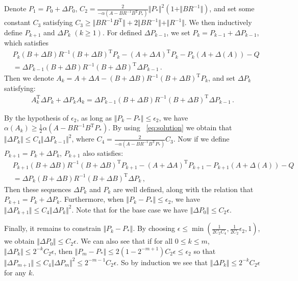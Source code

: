 \documentclass{article}
\theoremstyle{definition}
\begin{document}
Denote $P_{1}=P_{0}+\Delta P_{0}$,  $C_{2}=\frac{2}{-\alpha(A-BR^{-1}B^{\mathrm{T}}P_{*})}\Vert P_{*}\Vert ^{2}(1+\Vert BR^{-1}\Vert )$, and set some constant $C_{3}$ satisfying
$C_{3}\geq \Vert BR^{-1}B^{\mathrm{T}}\Vert +2\Vert BR^{-1}\Vert +\Vert R^{-1}\Vert $. We then inductively define $P_{k+1}$ and $\Delta P_{k}$ $(k\geq 1)$. For defined $\Delta P_{k-1}$, we set $P_{k}=P_{k-1}+\Delta P_{k-1}$, which satisfies
\begin{align*}
& P_{k}(B+\Delta B)R^{-1}(B+\Delta B)^{\mathrm{T}}P_{k}-(A+\Delta A)^{\mathrm{T}}P_{k}-P_{k}(A+\Delta(A))-Q\\&=\Delta P_{k-1}(B+\Delta B)R^{-1}(B+\Delta B)^{\mathrm{T}}\Delta P_{k-1}\,.
\end{align*} 
Then we denote $A_{k}=A+\Delta A-(B+\Delta B)R^{-1}(B+\Delta B)^{\mathrm{T}}P_{k}$, and set $\Delta P_{k}$ satisfying:
\begin{align*}
A^{\mathrm{T}}_{k}\Delta P_{k}+\Delta P_{k}A_{k} = \Delta P_{k-1}(B+\Delta B)R^{-1}(B+\Delta B)^{\mathrm{T}}\Delta P_{k-1}\,.
\end{align*}

By the hypothesis of $\epsilon_{2}$, as long as $\Vert P_{k}-P_{*}\Vert\leq \epsilon_{2}$, we have $\alpha(A_{k})\geq\frac{1}{2}\alpha(A-BR^{-1}B^{\mathrm{T}}P_{*})$. By using ~\eqref{eq:solution} we obtain that $\Vert \Delta P_{k}\Vert \leq C_{4}\Vert \Delta P_{k-1}\Vert ^{2}$, where $C_{4}=\frac{2}{-\alpha(A-BR^{-1}B^{\mathrm{T}}P_{*})}C_{3}$. Now if we define $P_{k+1}=P_{k}+\Delta P_{k}$, $P_{k+1}$ also satisfies:
\begin{align*}
& P_{k+1}(B+\Delta B)R^{-1}(B+\Delta B)^{\mathrm{T}}P_{k+1}-(A+\Delta A)^{\mathrm{T}}P_{k+1}-P_{k+1}(A+\Delta(A))-Q\\&=\Delta P_{k}(B+\Delta B)R^{-1}(B+\Delta B)^{\mathrm{T}}\Delta P_{k}\,,
\end{align*} 
Then these sequences $\Delta P_{k}$ and $P_{k}$ are well defined, along with the relation that $P_{k+1}=P_{k}+\Delta P_{k}$. Furthermore, when $\Vert P_{k}-P_{*}\Vert\leq \epsilon_{2}$, we have$\Vert\Delta P_{k+1}\Vert\leq C_{4}\Vert\Delta P_{k}\Vert^{2}$. Note that for the base case we have $\Vert \Delta P_{0}\Vert \leq C_{2}\epsilon$.

Finally, it remains to constrain $\Vert P_{k}-P_{*}\Vert$. By choosing $\epsilon\leq \min( \frac{1}{2C_{2}C_{4}}, \frac{1}{2C_{2}}\epsilon_{2},1)$, we obtain $\Vert \Delta P_{0}\Vert \leq C_{2}\epsilon$. We can also see that if for all $0\leq k\leq m$, $\Vert \Delta P_{k} \Vert \leq2^{-k}C_{2}\epsilon$, then $\Vert P_{m}-P_{*}\Vert \leq 2(1-2^{-m+1})C_{2}\epsilon\leq \epsilon_{2}$ so that $\Vert \Delta P_{m+1}\Vert \leq C_{4}\Vert \Delta P_{m}\Vert^{2}\leq 2^{-m-1}C_{2}\epsilon$. So by induction we see that $\Vert \Delta P_{k}\Vert \leq 2^{-k}C_{2}\epsilon$ for any $k$.
\end{document}
